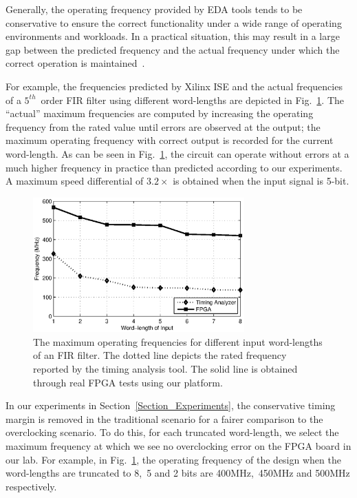 \documentclass[prodmode,acmtrets]{acmsmall} %
\begin{document}
Generally, the operating frequency provided by EDA tools tends to be conservative to ensure the correct functionality under a wide range of operating environments and workloads. In a practical situation, this may result in a large gap between the predicted frequency and the actual frequency under which the correct operation is maintained~\cite{gojman2013FPGA}.

For example, the frequencies predicted by Xilinx ISE and the actual frequencies of a $5^{th}$~order FIR filter using different word-lengths are depicted in Fig.~\ref{Fig:TimingMargin}. The ``actual'' maximum frequencies are computed by increasing the operating frequency from the rated value until errors are observed at the output; the maximum operating frequency with correct output is recorded for the current word-length. As can be seen in Fig.~\ref{Fig:TimingMargin}, the circuit can operate without errors at a much higher frequency in practice than predicted according to our experiments. A maximum speed differential of $3.2\times$ is obtained when the input signal is 5-bit.
%
\begin{figure}[ht]
  \centering
  \vspace{-2ex}
  \includegraphics[width=3.2in]{./Figures/Exp/FIR/RatedFrequency3.eps}
  \vspace{-1ex}
  \caption{The maximum operating frequencies for different input word-lengths of an FIR filter. The dotted line depicts the rated frequency reported by the timing analysis tool. The solid line is obtained through real FPGA tests using our platform.}
  \label{Fig:TimingMargin}
  \vspace{-.5ex}
\end{figure}

In our experiments in Section~\ref{Section_Experiments}, the conservative timing margin is removed in the traditional scenario for a fairer comparison to the overclocking scenario. To do this, for each truncated word-length, we select the maximum frequency at which we see no overclocking error on the FPGA board in our lab. For example, in Fig.~\ref{Fig:TimingMargin}, the operating frequency of the design when the word-lengths are truncated to 8,~5 and 2 bits are 400MHz,~450MHz and 500MHz respectively.
\end{document}
